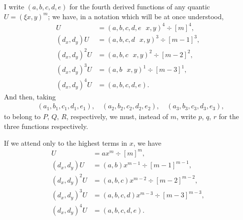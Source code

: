 \documentclass[11pt,a4paper]{book}
\begin{document}
I write $(a, b, c, d, e)$ for the fourth derived functions of any quantic $U = (\xi x, y)^m$; we have, in a notation which will be at once understood,
\begin{align*}
U &= (a, b, c, d, e \,\,\,\, x, y)^4 \div [m]^4, \\
(d_x, d_y)U &= (a, b, c, d \,\,\,\, x, y)^3 \div [m-1]^3, \\
(d_x, d_y)^2 U &= (a, b, c \,\,\,\, x, y)^2 \div [m-2]^2, \\
(d_x, d_y)^3 U &= (a, b \,\,\,\, x, y)^1 \div [m-3]^1, \\
(d_x, d_y)^4 U &= (a, b, c, d, e).
\end{align*}
And then, taking
\begin{align*}
&(a_1, b_1, c_1, d_1, e_1), \quad (a_2, b_2, c_2, d_2, e_2), \quad (a_3, b_3, c_3, d_3, e_3),
\end{align*}
to belong to $P$, $Q$, $R$, respectively, we must, instead of $m$, write $p$, $q$, $r$ for the three functions respectively.

If we attend only to the highest terms in $x$, we have
\begin{align*}
U &= ax^m \div [m]^m, \\
(d_x, d_y)U &= (a, b)x^{m-1} \div [m-1]^{m-1}, \\
(d_x, d_y)^2 U &= (a, b, c)x^{m-2} \div [m-2]^{m-2}, \\
(d_x, d_y)^3 U &= (a, b, c, d)x^{m-3} \div [m-3]^{m-3}, \\
(d_x, d_y)^4 U &= (a, b, c, d, e).
\end{align*}
\end{document}
